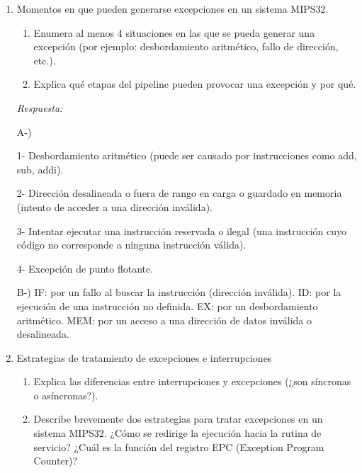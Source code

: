 \documentclass[11pt, a4paper]{article}
\begin{document}
\begin{enumerate}[leftmargin=*, label=\arabic*.]
    \vspace{0.2cm}
    \textit{Respuesta:} Cuando se produce una interrupción, lo que estuviese ejecutándose queda en pausa hasta que se atienda la interrupción. Si no se resguardan los registros, en caso de que estos estuviesen siendo usados, esto conllevaría a que tuviesen valores incorrectos, provocando resultados o comportamientos que no corresponderían en una ejecución normal.
    \vspace{1.5cm}

    \item Momentos en que pueden generarse excepciones en un sistema MIPS32.
    \begin{enumerate}[label=\alph*)]
        \item Enumera al menos 4 situaciones en las que se pueda generar una excepción (por ejemplo: desbordamiento aritmético, fallo de dirección, etc.).
        \item Explica qué etapas del pipeline pueden provocar una excepción y por qué.
    \end{enumerate}
    
    \vspace{0.2cm}
    \textit{Respuesta:}

    A-)

    1- Desbordamiento aritmético (puede ser causado por instrucciones como add, sub, addi).

    2- Dirección desalineada o fuera de rango en carga o guardado en memoria (intento de acceder a una dirección inválida).

    3- Intentar ejecutar una instrucción reservada o ilegal (una instrucción cuyo código no corresponde a ninguna instrucción válida).

    4- Excepción de punto flotante.

    B-) IF: por un fallo al buscar la instrucción (dirección inválida). ID: por la ejecución de una instrucción no definida. EX: por un desbordamiento aritmético. MEM: por un acceso a una dirección de datos inválida o desalineada.
    \vspace{2cm}

    \item Estrategias de tratamiento de excepciones e interrupciones
    \begin{enumerate}[label=\alph*)]
        \item Explica las diferencias entre interrupciones y excepciones (¿son síncronas o asíncronas?).
        \item Describe brevemente dos estrategias para tratar excepciones en un sistema MIPS32. ¿Cómo se redirige la ejecución hacia la rutina de servicio? ¿Cuál es la función del registro EPC (Exception Program Counter)?
    \end{enumerate}
    

\end{enumerate}
\end{document}
